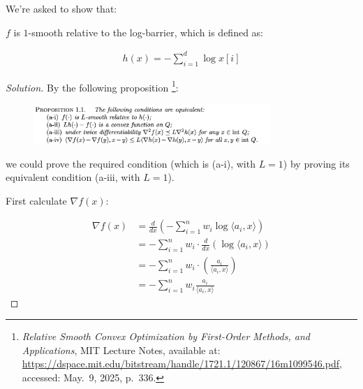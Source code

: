 \documentclass{article}
\newenvironment{solution}
  {\renewcommand\qedsymbol{$\blacksquare$}\begin{proof}[Solution]}
  {\end{proof}}
\begin{document}
We're asked to show that:

$f$ is $1$-smooth relative to the log-barrier, which is defined as:

\begin{align*}
    h(x) = -\sum_{i=1}^d \log x[i]
\end{align*}

\begin{solution}
    



By the following proposition
\footnote{\textit{Relative Smooth Convex Optimization by First-Order Methods, and Applications}, MIT Lecture Notes, available at: \url{https://dspace.mit.edu/bitstream/handle/1721.1/120867/16m1099546.pdf}, accessed: May.~9, 2025, p.~336.}:
\begin{figure}[H]
    \centering
    \includegraphics[width = 0.8\textwidth]{proposition_1.1}
\end{figure}
\bigskip

we could prove the required condition (which is (a-i), with $L = 1$) 
by proving its equivalent condition (a-iii, with $L = 1$).
\bigskip

First calculate $\nabla f(x)$:

\begin{align*}
    \nabla f(x) 
    &= \frac{d}{dx} \left( -\sum_{i=1}^n w_i \log \langle a_i, x \rangle \right) \\
    &= -\sum_{i=1}^n w_i \cdot \frac{d}{dx} \left( \log \langle a_i, x \rangle \right) \\
    &= -\sum_{i=1}^n w_i \cdot \left(\frac{a_i}{\langle a_i, x \rangle}\right) \\
    &= -\sum_{i=1}^n w_i \frac{a_i}{\langle a_i, x \rangle}
\end{align*}


\end{solution}
\end{document}
